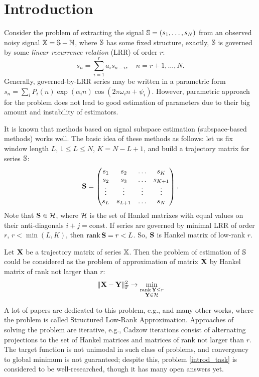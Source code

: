 \documentclass[12pt,a4paper,fleqn,leqno]{article}
\def\rank{\mathop{\mathrm{rank}}}
\begin{document}
\section{Introduction}
Consider the problem of extracting the signal $\mathbb{S} = (s_1, \ldots, s_N)$ from an observed noisy signal $\mathbb{X} = \mathbb{S} + \mathbb{N}$, where $\mathbb{S}$ has some fixed structure, exactly, $\mathbb{S}$ is governed by some \emph{linear recurrence relation} (LRR) of order $r$:
\begin{equation*}
s_n = \sum_{i = 1}^{r} a_i s_{n-i}, \quad n = r + 1, \ldots, N.
\end{equation*}
Generally, governed-by-LRR series may be written in a parametric form \\ $s_n = \sum_i P_i(n) \exp(\alpha_i n) \cos(2 \pi \omega_i n + \psi_i)$. However, parametric approach for the problem does not lead to good estimation of parameters due to their big amount and instability of estimators.

It is known that methods based on signal subspace estimation (subspace-based methods) works well. The basic idea of these methods as follows: let us fix window length $L$, $1 \le L \le N$, $K = N - L + 1$, and build a trajectory matrix for series $\mathbb{S}$:
\begin{equation*}
\mathbf{S} = \begin{pmatrix}
s_1 & s_2 & \ldots & s_K \\
s_2 & s_3 & \ldots & s_{K + 1} \\
\vdots & \vdots & \vdots & \vdots \\
s_L & s_{L + 1} & \ldots & s_N
\end{pmatrix}.
\end{equation*}
Note that $\mathbf{S}\in \mathcal{H}$, where $\mathcal{H}$ is the set of Hankel matrixes with equal values on their anti-diagonals $i+j=\mathrm{const}$.
If series are governed by minimal LRR of order $r$, $r < \min(L, K)$, then $\rank \bfS = r < L$. So, $\mathbf{S}$ is Hankel matrix of low-rank $r$.

Let $\mathbf{X}$ be a trajectory matrix of series $\mathbb{X}$. Then the problem of estimation of $\mathbb{S}$ could be considered as the problem of approximation of matrix $\mathbf{X}$ by Hankel matrix of rank not larger than $r$:
\begin{equation}\label{introd_task}
\|\bfX - \bfY\|^2_\rmF \to \min_{\substack{\rank \bfY \le r \\ \bfY \in \calH}}
\end{equation}

A lot of papers are dedicated to this problem, e.g., \cite{Cadzow1988, Markovsky2011, Usevich.Markovsky2014, Gillard.Zhigljavsky2013} and many other works, where the problem is called Structured Low-Rank Approximation. Approaches of solving the problem are iterative, e.g., Cadzow iterations consist of alternating projections to the set of Hankel matrices and matrices of rank not larger than $r$. The target function is not unimodal in such class of problems, and convergency to global minimum is not guaranteed; despite this, problem \eqref{introd_task} is considered to be well-researched, though it has many open answers yet.
\end{document}
